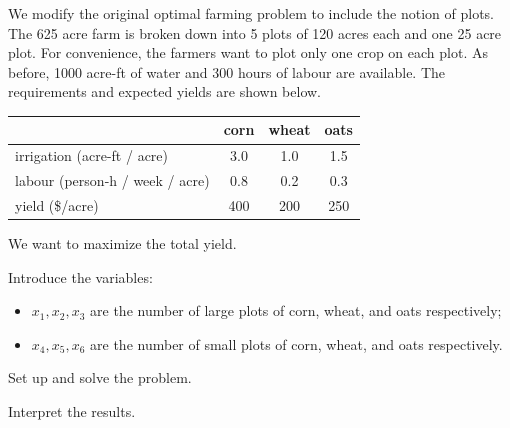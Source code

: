 \documentclass{workbook}
\begin{document}
\begin{slide}
\question

\begin{problem}
We modify the original optimal farming problem to include the notion of plots. The 625 acre farm is broken down into 5 plots of 120 acres each and one 25 acre plot. For convenience, the farmers want to plot only one crop on each plot. As before, 1000 acre-ft of water and 300 hours of labour are available. 
The requirements and expected yields are shown below.
	
	\begin{center}
	\small
	\begin{tabular}{l|c|c|c}
	& corn & wheat & oats \\ \hline
	irrigation (acre-ft / acre) & 3.0 & 1.0 & 1.5 \\ \hline
	labour (person-h / week / acre) & 0.8 & 0.2 & 0.3 \\ \hline
	yield (\$/acre) & 400 & 200 & 250 \\ %
	\end{tabular}
	\end{center}
	
	We want to maximize the total yield.
\end{problem}

Introduce the variables:
\begin{itemize}
	\item $x_1, x_2, x_3$ are the number of large plots of corn, wheat, and oats respectively;
	\item $x_4, x_5, x_6$ are the number of small plots of corn, wheat, and oats respectively.
\end{itemize}

\begin{parts}
	\item Set up and solve the problem.
	\item Interpret the results.
\end{parts}

	
\end{slide}
\end{document}
